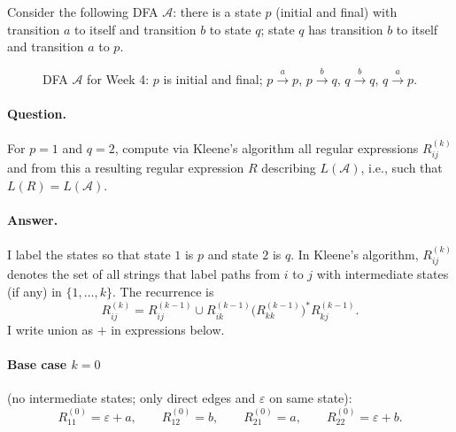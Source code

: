 \documentclass{article}
\theoremstyle{theorem}
\theoremstyle{definition}
\theoremstyle{remark}
\begin{document}
Consider the following DFA $\mathcal{A}$: there is a state $p$ (initial and final) with transition $a$ to itself and transition $b$ to state $q$; state $q$ has transition $b$ to itself and transition $a$ to $p$.

\begin{figure}[H]
  \centering
  \caption{DFA $\mathcal{A}$ for Week 4: $p$ is initial and final; $p \xrightarrow{a} p$, $p \xrightarrow{b} q$, $q \xrightarrow{b} q$, $q \xrightarrow{a} p$.}
  \label{fig:week4dfa}
\end{figure}

\paragraph{Question.} For $p = 1$ and $q = 2$, compute via Kleene's algorithm all regular expressions $R^{(k)}_{ij}$ and from this a resulting regular expression $R$ describing $L(\mathcal{A})$, i.e., such that $L(R) = L(\mathcal{A})$.

\paragraph{Answer.} I label the states so that state $1$ is $p$ and state $2$ is $q$. In Kleene's algorithm, $R^{(k)}_{ij}$ denotes the set of all strings that label paths from $i$ to $j$ with intermediate states (if any) in $\{1,\ldots,k\}$. The recurrence is
\[
R^{(k)}_{ij} = R^{(k-1)}_{ij} \cup R^{(k-1)}_{ik} \bigl(R^{(k-1)}_{kk}\bigr)^* R^{(k-1)}_{kj}.
\]
I write union as $+$ in expressions below.

\paragraph{Base case $k=0$} (no intermediate states; only direct edges and $\varepsilon$ on same state):
\[
R^{(0)}_{11} = \varepsilon + a,\qquad
R^{(0)}_{12} = b,\qquad
R^{(0)}_{21} = a,\qquad
R^{(0)}_{22} = \varepsilon + b.
\]
\end{document}
